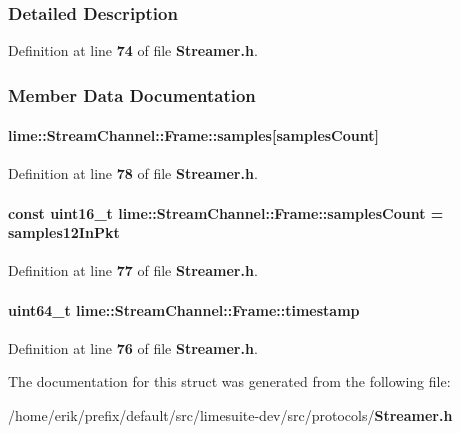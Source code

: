 \subsubsection{Detailed Description}


Definition at line {\bf 74} of file {\bf Streamer.\+h}.



\subsubsection{Member Data Documentation}
\paragraph[{samples}]{ lime\+::\+Stream\+Channel\+::\+Frame\+::samples[{\bf samples\+Count}]}\label{structlime_1_1StreamChannel_1_1Frame_af8459f42caa7138088128f3d64753891}


Definition at line {\bf 78} of file {\bf Streamer.\+h}.

\paragraph[{samples\+Count}]{\setlength{\rightskip}{0pt plus 5cm}const uint16\+\_\+t lime\+::\+Stream\+Channel\+::\+Frame\+::samples\+Count = {\bf samples12\+In\+Pkt}\hspace{0.3cm}{\ttfamily [static]}}\label{structlime_1_1StreamChannel_1_1Frame_ada6c40d156253455ae0b2f0da016c572}


Definition at line {\bf 77} of file {\bf Streamer.\+h}.

\paragraph[{timestamp}]{\setlength{\rightskip}{0pt plus 5cm}uint64\+\_\+t lime\+::\+Stream\+Channel\+::\+Frame\+::timestamp}\label{structlime_1_1StreamChannel_1_1Frame_a02b11520d6b50893c2632648d621a29b}


Definition at line {\bf 76} of file {\bf Streamer.\+h}.



The documentation for this struct was generated from the following file\+:\begin{DoxyCompactItemize}
\item 
/home/erik/prefix/default/src/limesuite-\/dev/src/protocols/{\bf Streamer.\+h}\end{DoxyCompactItemize}
